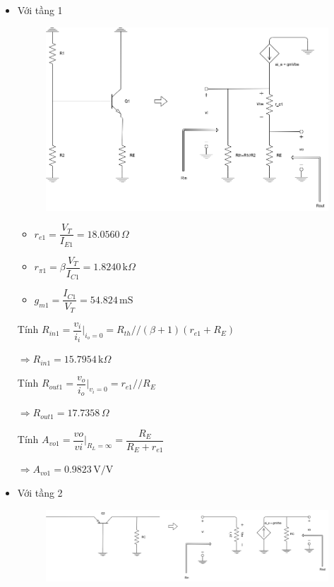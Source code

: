 \begin{itemize}[label=-]
	\item Với tầng 1
	
	\begin{figure}[H]
		\centering
		\includegraphics[width=.8\linewidth]{./my-chapters/my-diagrams/Question5/cauc_stage1.png}
	\end{figure}
	
	\begin{itemize}[label=+, leftmargin=2cm]
		\item $r_{e1} = \dfrac{V_{T}}{I_{E1}} = 18.0560\,\Omega$
		\item $r_{\pi1} = \beta\dfrac{V_{T}}{I_{C1}} = 1.8240\,\text{k}\Omega$
		\item $g_{m1} = \dfrac{I_{C1}}{V_{T}} = 54.824\,\text{mS}$
	\end{itemize}
	
	Tính $R_{in1} = \dfrac{v_{i}}{i_{i}}\bigg|_{i_{o} = 0} = R_{th} // (\beta + 1)(r_{e1} + R_{E})$
	
	$\Rightarrow R_{in1} = 15.7954\,\text{k}\Omega$
	
	Tính $R_{out1} = \dfrac{v_{o}}{i_{o}}\bigg|_{v_{i} = 0} = r_{e1} // R_{E}$
	
	$\Rightarrow R_{out1} = 17.7358\,\Omega$
	
	Tính $A_{vo1} = \dfrac{vo}{vi}\bigg|_{R_{L} = \infty} = \dfrac{R_{E}}{R_{E} + r_{e1}}$
	
	$\Rightarrow A_{vo1} = 0.9823\,\text{V/V}$
	\item Với tầng 2
	
	\begin{figure}[H]
		\centering
		\includegraphics[width=.8\linewidth]{./my-chapters/my-diagrams/Question5/cauc_stagte2.png}
	\end{figure}
	

\end{itemize}
